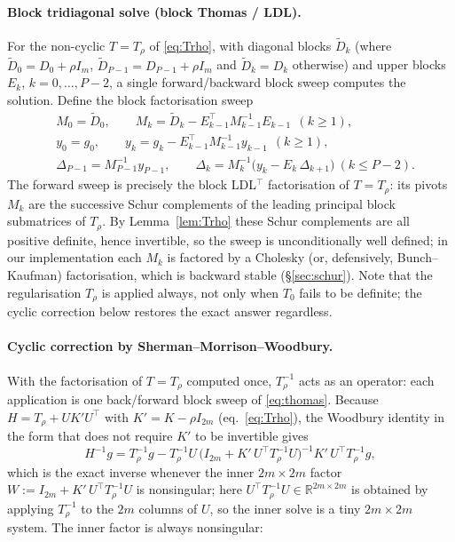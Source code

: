 \documentclass{amsart}
\newcommand{\R}{\mathbb{R}}
\begin{document}
\paragraph{Block tridiagonal solve (block Thomas / LDL).}
For the non-cyclic $T=T_\rho$ of \eqref{eq:Trho}, with diagonal blocks
$\widetilde D_k$ (where $\widetilde D_0=D_0+\rho I_m$, $\widetilde D_{P-1}=D_{P-1}+\rho
I_m$ and $\widetilde D_k=D_k$ otherwise) and upper blocks $E_k$, $k=0,\dots,P-2$, a
single forward/backward block sweep computes the solution. Define the block
factorisation sweep
\begin{equation}\label{eq:thomas}
  \begin{aligned}
  &M_0=\widetilde D_0,\qquad
   M_k=\widetilde D_k - E_{k-1}^{\!\top}M_{k-1}^{-1}E_{k-1}\ \ (k\ge1),\\
  &y_0=g_0,\qquad y_k=g_k-E_{k-1}^{\!\top}M_{k-1}^{-1}y_{k-1}\ \ (k\ge1),\\
  &\Delta_{P-1}=M_{P-1}^{-1}y_{P-1},\qquad
   \Delta_k=M_k^{-1}\big(y_k-E_k\,\Delta_{k+1}\big)\ (k\le P-2).
  \end{aligned}
\end{equation}
The forward sweep is precisely the block LDL$^{\!\top}$ factorisation of $T=T_\rho$:
its pivots $M_k$ are the successive Schur complements of the leading principal block
submatrices of $T_\rho$. By Lemma~\ref{lem:Trho} these Schur complements are all
positive definite, hence invertible, so the sweep is unconditionally well defined; in
our implementation each $M_k$ is factored by a Cholesky (or, defensively,
Bunch--Kaufman) factorisation, which is backward stable (\S\ref{sec:schur}). Note that
the regularisation $T_\rho$ is applied always, not only when $T_0$ fails to be
definite; the cyclic correction below restores the exact answer regardless.

\paragraph{Cyclic correction by Sherman--Morrison--Woodbury.}
With the factorisation of $T=T_\rho$ computed once, $T_\rho^{-1}$ acts as an operator:
each application is one back/forward block sweep of \eqref{eq:thomas}. Because
$H=T_\rho+UK'U^{\!\top}$ with $K'=K-\rho I_{2m}$ (eq.~\eqref{eq:Trho}), the
Woodbury identity in the form that does not require $K'$ to be invertible gives
\begin{equation}\label{eq:woodbury2}
  H^{-1}g
   = T_\rho^{-1}g
     - T_\rho^{-1}U\,\big(I_{2m}+K'\,U^{\!\top}T_\rho^{-1}U\big)^{-1}
       K'\,U^{\!\top}T_\rho^{-1}g ,
\end{equation}
which is the exact inverse whenever the inner $2m\times2m$ factor
$W:=I_{2m}+K'\,U^{\!\top}T_\rho^{-1}U$ is nonsingular; here
$U^{\!\top}T_\rho^{-1}U\in\R^{2m\times2m}$ is obtained by applying $T_\rho^{-1}$ to the
$2m$ columns of $U$, so the inner solve is a tiny $2m\times2m$ system. The inner
factor is always nonsingular:
\end{document}
